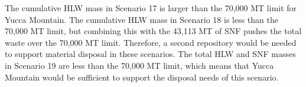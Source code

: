 The cumulative \gls{HLW} mass in Scenario 17 is larger than the 70,000
MT limit for Yucca Mountain. The cumulative \gls{HLW} mass 
in Scenario 18 is less than the 70,000 MT limit, but combining this with 
the 43,113 MT of \gls{SNF} pushes the total waste over the 70,000 MT 
limit. Therefore, a second repository would be needed to support 
material disposal in these scenarios. The total \gls{HLW} and \gls{SNF} 
masses in Scenario 19 are less than the 70,000 MT limit, which means 
that Yucca Mountain would be sufficient to support the disposal 
needs of this scenario. 